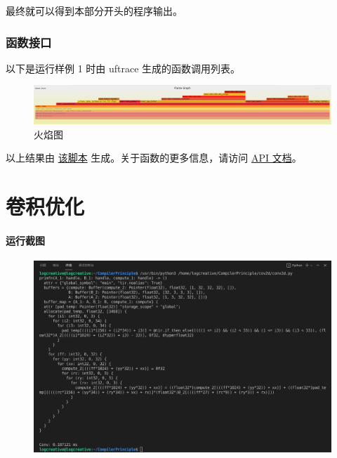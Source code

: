 \documentclass[UTF8]{article}
\begin{document}
最终就可以得到本部分开头的程序输出。

\section{函数接口}

以下是运行样例 1 时由 uftrace\cite{uft} 生成的函数调用列表。


\begin{figure}[H]
    \centering
        \includegraphics[width=\textwidth]{img/flame.png}
    \caption{火焰图\cite{flame}}
    \label{fig:flame}
\end{figure}

以上结果由 \href{run:../opg/uftrace.sh}{该脚本} 生成。关于函数的更多信息，请访问 \href{run:../opg/target/doc/opg/index.html}{API 文档}。%

\part{卷积优化}
\subsection*{运行截图}
\begin{figure}
    \centering
    \includegraphics[width=\textwidth]{img/raw1.png}
\end{figure}
\end{document}
